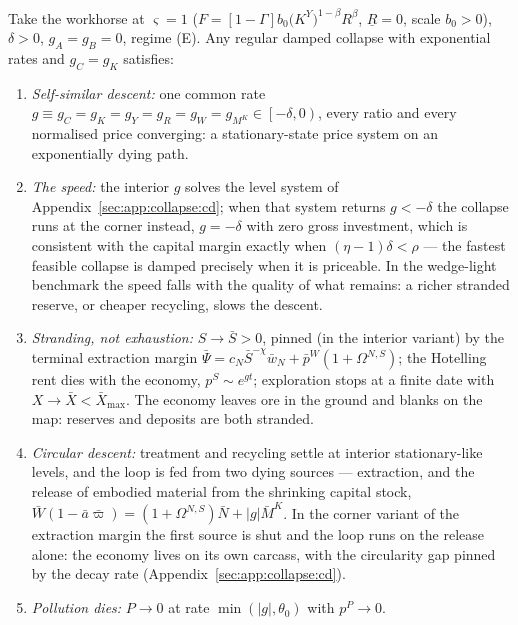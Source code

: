 \begin{proposition}
\label{prop:sp:wh:collapse}
Take the workhorse at $\varsigma=1$
($F=\left[1-\Gamma\right]b_0\big(K^Y\big)^{1-\beta}R^\beta$, $\underline R=0$, scale
$b_0>0$), $\delta>0$, $g_A=g_B=0$,
regime (E). Any regular damped collapse with exponential rates and $g_C=g_K$ satisfies:
\begin{enumerate}
    \item \emph{Self-similar descent:} one common rate
    $g\equiv g_C=g_K=g_Y=g_R=g_W=g_{M^K}\in\left[-\delta,0\right)$, every ratio and every
    normalised price converging: a stationary-state price system on an exponentially dying
    path.
    \item \emph{The speed:} the interior $g$ solves the level system of
    Appendix~\ref{sec:app:collapse:cd}; when that system returns $g<-\delta$ the collapse
    runs at the corner instead, $g=-\delta$ with zero gross investment, which is consistent
    with the capital margin exactly when $\left(\eta-1\right)\delta<\rho$ --- the fastest
    feasible collapse is damped precisely when it is priceable. In the wedge-light benchmark
    the speed falls with the quality of what remains: a richer stranded reserve, or cheaper
    recycling, slows the descent.
    \item \emph{Stranding, not exhaustion:} $S\to\bar S>0$, pinned (in the interior variant)
    by the terminal extraction margin
    $\bar\Psi=c_N\bar S^{-\chi}\bar w_N+\bar p^W\!\left(1+\Omega^{N,S}\right)$; the Hotelling
    rent dies with the economy, $p^S\sim e^{gt}$; exploration stops at a finite date with
    $X\to\bar X<\bar X_{\max}$. The economy leaves ore in the ground and blanks on the map:
    reserves and deposits are both stranded.
    \item \emph{Circular descent:} treatment and recycling settle at interior
    stationary-like levels, and the loop is fed from two dying sources --- extraction, and
    the release of embodied material from the shrinking capital stock,
    $\bar W\left(1-\bar a\bar\varpi\right)
    =\left(1+\Omega^{N,S}\right)\bar N+\left|g\right|\bar M^K$. In the corner variant of the
    extraction margin the first source is shut and the loop runs on the release alone: the
    economy lives on its own carcass, with the circularity gap pinned by the decay rate
    (Appendix~\ref{sec:app:collapse:cd}).
    \item \emph{Pollution dies:} $P\to0$ at rate $\min\left(\left|g\right|,\theta_0\right)$
    with $p^P\to0$.
\end{enumerate}
\end{proposition}

